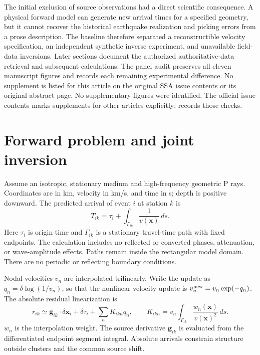 \documentclass[11pt]{article}
\begin{document}
The initial exclusion of source observations had a direct scientific consequence.
A physical forward model can generate new arrival times for a specified
geometry, but it cannot recover the historical earthquake realization and
picking errors from a prose description. The baseline therefore separated a
reconstructible velocity specification, an independent synthetic inverse
experiment, and unavailable field-data inversions. Later sections document the
authorized authoritative-data retrieval and subsequent calculations. The panel
audit preserves all eleven manuscript figures and records each remaining
experimental difference. No supplement is listed for this article on the original SSA issue contents
or its original abstract page. No supplementary figures were identified.
The official issue contents marks supplements for other articles explicitly;
 records those checks.

\section{Forward problem and joint inversion}
Assume an isotropic, stationary medium and high-frequency geometric P rays.
Coordinates are in km, velocity in km/s, and time in s; depth is positive
downward. The predicted arrival of event $i$ at station $k$ is
\begin{equation}
 T_{ik}=\tau_i+\int_{\Gamma_{ik}}\frac{1}{v(\mathbf{x})}\,ds.
\end{equation}
Here $\tau_i$ is origin time and $\Gamma_{ik}$ is a stationary travel-time
path with fixed endpoints. The calculation includes no reflected or converted
phases, attenuation, or wave-amplitude effects. Paths remain inside the
rectangular model domain. There are no periodic or reflecting boundary
conditions.

Nodal velocities $v_n$ are interpolated trilinearly. Write the update as
$q_n=\delta\log(1/v_n)$, so that the nonlinear velocity update is
$v_n^{\rm new}=v_n\exp(-q_n)$. The absolute residual linearization is
\begin{equation}
 r_{ik}\simeq\mathbf{g}_{ik}\cdot\delta\mathbf{x}_i+
 \delta\tau_i+\sum_n K_{ikn}q_n,\qquad
 K_{ikn}=v_n\int_{\Gamma_{ik}}\frac{w_n(\mathbf{x})}{v(\mathbf{x})^2}\,ds.
\end{equation}
$w_n$ is the interpolation weight. The source derivative $\mathbf{g}_{ik}$
is evaluated from the differentiated endpoint segment integral. Absolute
arrivals constrain structure outside clusters and the common source shift.
\end{document}
